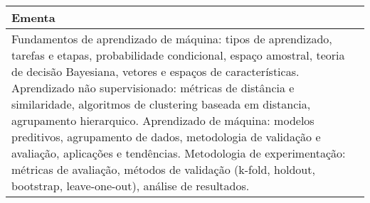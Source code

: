 \begin{quadro}[ht!]
\begin{tabular}{|p{3cm} p{2cm} p{3cm} p{2cm} p{3cm} p{2cm}|}
\multicolumn{6}{|p{15cm}|}{\cellcolor{blue1} Ementa} \\\hline
\hline\multicolumn{6}{|p{15cm}|}{\scriptsize Fundamentos de aprendizado de máquina: tipos de aprendizado, tarefas e etapas, probabilidade condicional, espaço amostral, teoria de decisão Bayesiana, vetores e espaços de características. Aprendizado não supervisionado: métricas de distância e similaridade, algoritmos de clustering baseada em distancia, agrupamento hierarquico. Aprendizado de máquina: modelos preditivos, agrupamento de dados, metodologia de validação e avaliação, aplicações e tendências. Metodologia de experimentação: métricas de avaliação, métodos de validação (k-fold, holdout, bootstrap, leave-one-out), análise de resultados.}\\\hline 
\hline
	\end{tabular}
\end{quadro}


